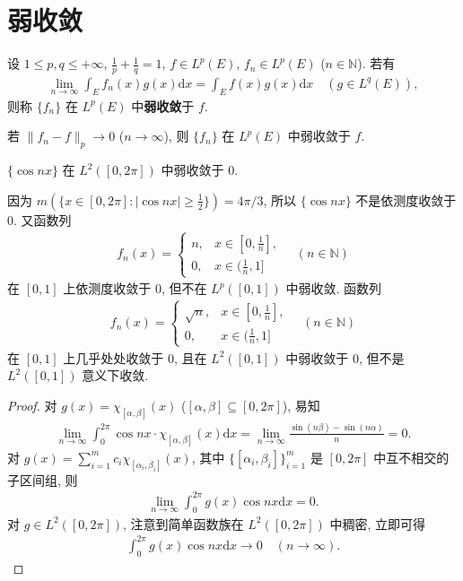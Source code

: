 \documentclass[../../main.tex]{subfiles}%
\begin{document}
\section{弱收敛}

\begin{definition}[弱收敛]
设 $1\leqslant p,q\leqslant +\infty$, $\frac{1}{p}+\frac{1}{q}=1$, $f\in L^p(E)$, $f_n\in L^p(E)$ ($n\in\mathbb{N}$). 若有
\begin{align*}
\lim_{n\to\infty}\int_E f_n(x)g(x)\mathrm{d}x=\int_E f(x)g(x)\mathrm{d}x\quad (g\in L^q(E)),
\end{align*}
则称 $\{f_n\}$ 在 $L^p(E)$ 中\textbf{弱收敛}于 $f$.
\end{definition}
\begin{remark}
若 $\|f_n-f\|_p\to 0$ ($n\to\infty$), 则 $\{f_n\}$ 在 $L^p(E)$ 中弱收敛于 $f$.
\end{remark}

\begin{example}
$\{\cos nx\}$ 在 $L^2([0,2\pi])$ 中弱收敛于 $0$.
\end{example}
\begin{remark}
因为 $m(\{x\in[0,2\pi]:|\cos nx|\geqslant \frac{1}{2}\})=4\pi/3$, 所以 $\{\cos nx\}$ 不是依测度收敛于 $0$. 又函数列
\begin{align*}
f_n(x)=
\begin{cases}
n, & x\in[0,\frac{1}{n}], \\
0, & x\in(\frac{1}{n},1]
\end{cases}
\quad (n\in\mathbb{N})
\end{align*}
在 $[0,1]$ 上依测度收敛于 $0$, 但不在 $L^p([0,1])$ 中弱收敛. 函数列
\begin{align*}
f_n(x)=
\begin{cases}
\sqrt{n}, & x\in[0,\frac{1}{n}], \\
0, & x\in(\frac{1}{n},1]
\end{cases}
\quad (n\in\mathbb{N})
\end{align*}
在 $[0,1]$ 上几乎处处收敛于 $0$, 且在 $L^2([0,1])$ 中弱收敛于 $0$, 但不是 $L^2([0,1])$ 意义下收敛.
\end{remark}
\begin{proof}

对 $g(x)=\chi_{[\alpha,\beta]}(x)$ ($[\alpha,\beta]\subseteq[0,2\pi]$), 易知
\begin{align*}
\lim_{n\to\infty}\int_0^{2\pi}\cos nx\cdot\chi_{[\alpha,\beta]}(x)\mathrm{d}x=\lim_{n\to\infty}\frac{\sin(n\beta)-\sin(n\alpha)}{n}=0.
\end{align*}
对 $g(x)=\sum_{i=1}^m c_i\chi_{[\alpha_i,\beta_i]}(x)$, 其中 $\{[\alpha_i,\beta_i]\}_{i=1}^m$ 是 $[0,2\pi]$ 中互不相交的子区间组, 则
\begin{align*}
\lim_{n\to\infty}\int_0^{2\pi}g(x)\cos nx\mathrm{d}x=0.
\end{align*}
对 $g\in L^2([0,2\pi])$, 注意到简单函数族在 $L^2([0,2\pi])$ 中稠密, 立即可得
\begin{align*}
\int_0^{2\pi}g(x)\cos nx\mathrm{d}x\to 0\quad (n\to\infty).
\end{align*}

\end{proof}
\end{document}
